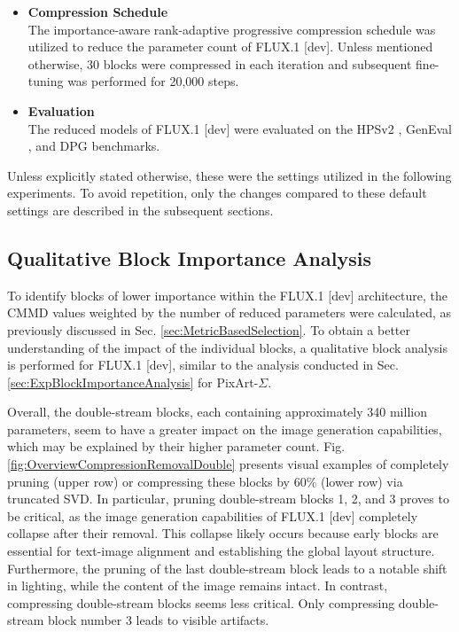 \begin{itemize}
	\item \textbf{Compression Schedule} \\
	The importance-aware rank-adaptive progressive compression schedule was utilized to reduce the parameter count of FLUX.1 {[dev]}. Unless mentioned otherwise, 30 blocks were compressed in each iteration and subsequent fine-tuning was performed for 20,000 steps.
	
	\item \textbf{Evaluation} \\
	The reduced models of FLUX.1 {[dev]} were evaluated on the HPSv2 \cite{HPSv2}, GenEval \cite{ghosh2023geneval}, and DPG \cite{DPG} benchmarks.
	
\end{itemize} 

Unless explicitly stated otherwise, these were the settings utilized in the following experiments. To avoid repetition, only the changes compared to these default settings are described in the subsequent sections.



\subsection{Qualitative Block Importance Analysis}
\label{sec:QualitativeBlockAnalysisFlux}
	
To identify blocks of lower importance within the FLUX.1 {[dev]} architecture, the \gls{CMMD} values weighted by the number of reduced parameters were calculated, as previously discussed in Sec. \ref{sec:MetricBasedSelection}. To obtain a better understanding of the impact of the individual blocks, a qualitative block analysis is performed for FLUX.1 {[dev]}, similar to the analysis conducted in Sec. \ref{sec:ExpBlockImportanceAnalysis} for PixArt-$\Sigma$. 

Overall, the double-stream blocks, each containing approximately 340 million parameters, seem to have a greater impact on the image generation capabilities, which may be explained by their higher parameter count. 
Fig. \ref{fig:OverviewCompressionRemovalDouble} presents visual examples of completely pruning (upper row) or compressing these blocks by 60\% (lower row) via truncated \gls{SVD}. In particular, pruning double-stream blocks 1, 2, and 3 proves to be critical, as the image generation capabilities of FLUX.1 {[dev]} completely collapse after their removal. This collapse likely occurs because early blocks are essential for text-image alignment and establishing the global layout structure. Furthermore, the pruning of the last double-stream block leads to a notable shift in lighting, while the content of the image remains intact. In contrast, compressing double-stream blocks seems less critical. Only compressing double-stream block number 3 leads to visible artifacts.


